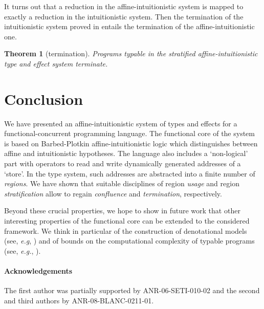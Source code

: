 \documentclass[11pt]{article}
\newtheorem{theorem}{Theorem}
\begin{document}
It turns out that a reduction in the affine-intuitionistic system is
mapped to exactly a reduction in the intuitionistic system.  Then the
termination of the intuitionistic system proved in \cite{Amadio09}
entails the termination of the affine-intuitionistic one.


\begin{theorem}[termination]\label{termination-thm}
Programs typable in the stratified affine-intuitionistic 
type and effect system terminate.
\end{theorem}


\section{Conclusion}
We have presented an affine-intuitionistic system of types and effects for 
a functional-concurrent programming language. 
The functional core of the system is based on Barbed-Plotkin 
affine-intuitionistic logic which distinguishes between affine and
intuitionistic hypotheses. 
The language also includes a `non-logical' part with operators
to read and write dynamically generated addresses of a `store'. 
In the type system, such addresses are abstracted into a 
finite number of {\em regions}. We have shown that 
suitable disciplines of region {\em usage} and region {\em stratification}
allow to regain  {\em confluence} and {\em termination}, respectively.

Beyond these crucial properties, we hope to show in future 
work that other interesting properties of the functional core can be extended
to the considered framework. We think in particular of
the construction of denotational models (see, {\em e.g}, \cite{Bierman95})
and of bounds on the computational complexity of typable  programs 
(see, {\em e.g.}, \cite{Girard98}).


{\footnotesize
\paragraph{Acknowledgements}
The first author was partially supported by ANR-06-SETI-010-02 and the second and
third authors by ANR-08-BLANC-0211-01.}
\end{document}
